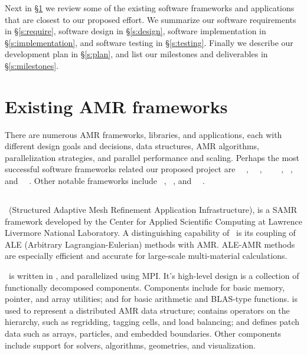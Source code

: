 \documentclass[10pt,twocolumn]{article}
\begin{document}
Next in \S\ref{s:review} we review some of the existing software
frameworks and applications that are closest to our proposed effort.
We summarize our software requirements in \S\ref{s:require}, software design in
\S\ref{s:design}, software implementation in \S\ref{s:implementation}, and
software testing in \S\ref{s:testing}.  Finally we describe our development
plan in \S\ref{s:plan}, and list our milestones and deliverables in
\S\ref{s:milestones}.

\section{Existing AMR frameworks} \label{s:review}

There are numerous AMR frameworks, libraries, and applications, each
with different design goals and decisions, data structures, AMR
algorithms, parallelization strategies, and parallel performance and
scaling.  Perhaps the most successful software frameworks related our
proposed project are
\chombo~\cite{wwwchombo}~\cite{CoGr09},
\samrai~\cite{WiHo01}~\cite{wwwsamraicode}, 
\paramesh~\cite{MaOl00}~\cite{OlMa05}~\cite{Ol06}~\cite{wwwparamesh},
\alps~\cite{BuBu09}, and
\gadget~\cite{wwwgadget}~\cite{Sp05}.  Other notable frameworks
include \clawpack~\cite{wwwclawpack}, \grace~\cite{PaLi10}, and
\carpet~\cite{ScDi06}~\cite{wwwcarpet}.

\subsection{\samrai} \label{ss:samrai}

\samrai\ (Structured Adaptive Mesh Refinement Application
Infrastructure), is a SAMR framework developed by the Center for
Applied Scientific Computing at Lawrence Livermore National
Laboratory.  A distinguishing capability of \samrai\ is its coupling
of ALE (Arbitrary Lagrangian-Eulerian) methods with AMR.  ALE-AMR
methods are especially efficient and accurate for large-scale
multi-material calculations.

\samrai\ is written in \cpp, and parallelized using MPI.  It's
high-level design is a collection of functionally decomposed
components.  Components include  for basic memory,
pointer, and array utilities; and  for basic
arithmetic and BLAS-type functions.   is used to
represent a distributed AMR data structure;  contains
operators on the hierarchy, such as regridding, tagging cells, and
load balancing; and  defines patch data such as
arrays, particles, and embedded boundaries.  Other components include
support for solvers, algorithms, geometries,  and visualization.
\end{document}

